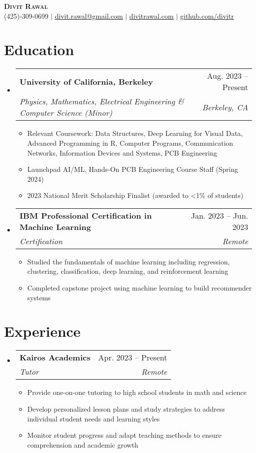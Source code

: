 \documentclass[letterpaper,11pt]{article}
\makeatletter
\newcommand{\resumeItem}[1]{
  \item\small{
    {#1 \vspace{-2pt}}
  }
}
\newcommand{\resumeSubheading}[4]{
  \vspace{-2pt}\item
    \begin{tabular*}{0.97\textwidth}[t]{l@{\extracolsep{\fill}}r}
      \textbf{#1} & #2 \\
      \textit{\small#3} & \textit{\small #4} \\
    \end{tabular*}\vspace{-7pt}
}
\newcommand{\resumeSubHeadingListStart}{\begin{itemize}[leftmargin=0.15in, label={}]}
\newcommand{\resumeSubHeadingListEnd}{\end{itemize}}
\newcommand{\resumeItemListStart}{\begin{itemize}}
\newcommand{\resumeItemListEnd}{\end{itemize}\vspace{-5pt}}
\makeatother
\begin{document}

\begin{center}
    \textbf{\Huge \scshape Divit Rawal} \\ \vspace{1pt}
    \small (425)-309-0699 $|$ \href{mailto:divit.rawal@gmail.com}{\underline{divit.rawal@gmail.com}} $|$ 
    \href{https://www.divitrawal.com}{\underline{divitrawal.com}} $|$
    \href{https://www.github.com/divitr/}{\underline{github.com/divitr}}
\end{center}

\section{Education}
  \resumeSubHeadingListStart
    \resumeSubheading
      {University of California, Berkeley}{Aug. 2023 -- Present}
      {Physics, Mathematics, Electrical Engineering \& Computer Science (Minor)}{Berkeley, CA}
      \resumeItemListStart
        \resumeItem{Relevant Coursework: Data Structures, Deep Learning for Visual Data, Advanced Programming in R, Computer Programs, Communication Networks,  Information Devices and Systems, PCB Engineering}
        \resumeItem{Launchpad  AI/ML, Hands-On PCB Engineering Course Staff (Spring 2024)}
        \resumeItem{2023 National Merit Scholarship Finalist (awarded to \textless 1\% of students)}
      \resumeItemListEnd
  \resumeSubHeadingListEnd

  \resumeSubHeadingListStart
    \resumeSubheading
      {IBM Professional Certification in Machine Learning}{Jan. 2023 -- Jun. 2023}
      {Certification}{Remote}
      \resumeItemListStart
        \resumeItem{Studied the fundamentals of machine learning including regression, clustering, classification, deep learning, and reinforcement learning}
        \resumeItem{Completed capstone project using machine learning to build recommender systems}
      \resumeItemListEnd
  \resumeSubHeadingListEnd

\section{Experience}
  \resumeSubHeadingListStart
    \resumeSubheading
      {Kairos Academics}{Apr. 2023 -- Present}
      {Tutor}{Remote}
      \resumeItemListStart
        \resumeItem{Provide one-on-one tutoring to high school students in math and science}
        \resumeItem{Develop personalized lesson plans and study strategies to address individual student needs and learning styles}
        \resumeItem{Monitor student progress and adapt teaching methods to ensure comprehension and academic growth}
      \resumeItemListEnd
  \resumeSubHeadingListEnd
\end{document}
